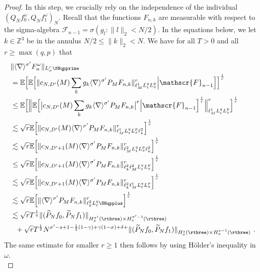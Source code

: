 \documentclass[11pt]{article}
\begin{document}
\begin{proof}
In this step, we crucially rely on the independence of the individual \( (Q_N f_0^\omega, Q_N f_1^\omega)_N \). 
Recall that the functions \( F_{n,k} \) are measurable with respect to the sigma-algebra \( \mathscr{F}_{n-1}  = \sigma( g_l \colon \| l \|_2 < N/2 ) \). In the equations below, we let \( k\in \mathbb{Z}^3 \) be in the annulus
\( N/2 \leq \| k \|_2 < N \). 
We have for all \( T>0 \) and all \( r \geq \max(q,p) \) that 
\begin{align}
&\| \langle \nabla \rangle^{\sigma^\prime} F_n^\omega \|_{L_\omega^r \SNqpprime}\notag \\
&= \mathbb{E}\Big[ \mathbb{E} \Big[ \| c_{N,D^\prime}(M) \sum_{k} g_k \langle \nabla \rangle^{\sigma^\prime} P_M F_{n,k} \|_{\ell_M^1 L_t^q  L_x^p}^r\Big| \mathscr{F}_{n-1} \Big] \Big] ^{\frac{1}{r}} \notag\\
&\leq \mathbb{E}\Big[ \Big\| \mathbb{E} \Big[ \big| c_{N,D^\prime}(M) \sum_{k} g_k \langle \nabla \rangle^{\sigma^\prime} P_M F_{n,k} \big|^r \Big| \mathscr{F}_{n-1}\Big]^{\frac{1}{r}} \Big\|_{\ell_M^1 L_t^q  L_x^p}^r \Big] ^{\frac{1}{r}} \notag\\
& \lesssim\sqrt{r}  \mathbb{E} \Big[ \| c_{N,D^\prime}(M)  \langle \nabla \rangle^{\sigma^\prime} P_M F_{n,k} \|_{ \ell_M^1 L_t^q L_x^p\ell_k^2}^r \Big] ^{\frac{1}{r}} \notag\\
& \lesssim\sqrt{r}  \mathbb{E} \Big[ \| c_{N,D^\prime+1}(M) \langle \nabla \rangle^{\sigma^\prime} P_M F_{n,k} \|_{\ell_M^2 L_t^q  L_x^p\ell_k^2}^r \Big] ^{\frac{1}{r}} \label{lin:eq_prob_strichartz_qp} \\
& \leq\sqrt{r}  \mathbb{E} \Big[ \| c_{N,D^\prime+1}(M)  \langle \nabla \rangle^{\sigma^\prime} P_M F_{n,k} \|_{\ell_k^2\ell_M^2 L_t^q  L_x^p}^r \Big] ^{\frac{1}{r}} \notag\\
& \lesssim\sqrt{r}  \mathbb{E} \Big[ \| c_{N,D^\prime+1}(M)  \langle \nabla \rangle^{\sigma^\prime} P_M F_{n,k} \|_{\ell_k^2\ell_M^1 L_t^q  L_x^p}^r \Big] ^{\frac{1}{r}}\notag \\
& \lesssim\sqrt{r}  \mathbb{E} \Big[ \|   \langle \nabla \rangle^{\sigma^\prime} P_M F_{n,k} \|_{\ell_k^2 L_t^q \SNqpplus}^r \Big] ^{\frac{1}{r}} \notag\\
&\lesssim \sqrt{r} T^\frac{1}{q} \|(\widetilde{P}_N f_0, \widetilde{P}_N f_1)\|_{H_x^{\sigma^\prime}(\rthree)\times H_x^{\sigma^\prime-1}(\rthree)} \notag\\
&~~+  \sqrt{r} T^{\frac{1}{2}} N^{\sigma^\prime-s+1-\frac{1}{2} (1-\gamma) + \gamma (1-\sigma) + \delta + } \| (\widetilde{P}_N f_0, \widetilde{P}_N f_1) \|_{H_x^s(\rthree)\times H_x^{s-1}(\rthree)} ~.\notag
\end{align}
The same estimate for smaller \( r\geq1 \) then follows by using Hölder's inequality in \( \omega \). \\


\end{proof}
\end{document}
